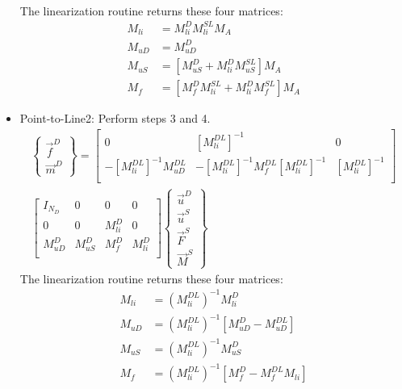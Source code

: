 \documentclass[10pt,letterpaper,oneside,notitlepage]{article}
\begin{document}
\begin{itemize}
\begin{multline}
			\end{multline}					
		The linearization routine returns these four matrices:
	\begin{align}
	 M_{li} &= M_{li}^D M_{li}^{SL} M_{A} \\ 
	 M_{uD} &= M_{uD}^D \\ 
	 M_{uS} &= \left[ M_{uS}^D + M_{li}^{D} M_{uS}^{SL}\right]M_{A} \\ 
	 M_{f}  &= \left[ M_{f}^D M_{li}^{SL} + M_{li}^{D} M_{f}^{SL} \right]M_{A}  \end{align} 
	
	
  \item Point-to-Line2: Perform steps 3 and 4.
			\begin{multline}
				\left\{	\begin{matrix} \vec{f}^{D} \\ \vec{m}^{D} \end{matrix} \right\} 
			  =
				\begin{bmatrix}
				0 							 & \left[ M_{li}^{DL} \right]^{-1} & 0   \\
				-\left[ M_{li}^{DL} \right]^{-1} M_{uD}^{DL} & 
				-\left[ M_{li}^{DL} \right]^{-1} M_{f}^{DL} \left[ M_{li}^{DL} \right]^{-1}  &
				 \left[ M_{li}^{DL} \right]^{-1} \\
				\end{bmatrix}						\\											
			 \begin{bmatrix}
				I_{N_D}					 & 0  								 & 0          & 0          \\
				0 							 & 0  								 & M_{li}^{D} & 0          \\
				M_{uD}^{D} 		   & M_{uS}^{D}    		   & M_{f}^{D}  & M_{li}^{D} \\
				\end{bmatrix}				
				\left\{	\begin{matrix} \vec{u}^D \\ \vec{u}^{S}  \\ \vec{F}^{S}  \\ \vec{M}^{S} \end{matrix} \right\} 				
			\end{multline}				
		The linearization routine returns these four matrices:
	\begin{align} M_{li} &= \left(M_{li}^{DL}\right)^{-1}M_{li}^D \\
	 M_{uD} &= \left(M_{li}^{DL}\right)^{-1}\left[M_{uD}^D - M_{uD}^{DL}\right] \\ 
	 M_{uS} &= \left(M_{li}^{DL}\right)^{-1}M_{uS}^D \\ 
	 M_{f}  &= \left(M_{li}^{DL}\right)^{-1}\left[M_{f}^D - M_{f}^{DL} M_{li} \right] \end{align} 


\end{itemize}
\end{document}
